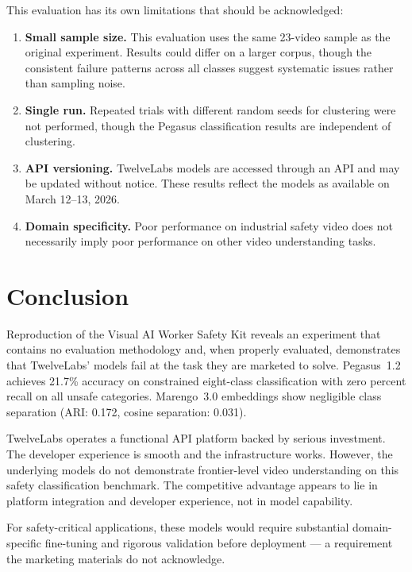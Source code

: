 \documentclass[11pt,a4paper]{article}
\begin{document}
This evaluation has its own limitations that should be acknowledged:

\begin{enumerate}
    \item \textbf{Small sample size.} This evaluation uses the same 23-video sample as the original experiment. Results could differ on a larger corpus, though the consistent failure patterns across all classes suggest systematic issues rather than sampling noise.
    \item \textbf{Single run.} Repeated trials with different random seeds for clustering were not performed, though the Pegasus classification results are independent of clustering.
    \item \textbf{API versioning.} TwelveLabs models are accessed through an API and may be updated without notice. These results reflect the models as available on March 12--13, 2026.
    \item \textbf{Domain specificity.} Poor performance on industrial safety video does not necessarily imply poor performance on other video understanding tasks.
\end{enumerate}

\section{Conclusion}

Reproduction of the Visual AI Worker Safety Kit reveals an experiment that contains no evaluation methodology and, when properly evaluated, demonstrates that TwelveLabs' models fail at the task they are marketed to solve. Pegasus~1.2 achieves 21.7\% accuracy on constrained eight-class classification with zero percent recall on all unsafe categories. Marengo~3.0 embeddings show negligible class separation (ARI: 0.172, cosine separation: 0.031).

TwelveLabs operates a functional API platform backed by serious investment. The developer experience is smooth and the infrastructure works. However, the underlying models do not demonstrate frontier-level video understanding on this safety classification benchmark. The competitive advantage appears to lie in platform integration and developer experience, not in model capability.

For safety-critical applications, these models would require substantial domain-specific fine-tuning and rigorous validation before deployment --- a requirement the marketing materials do not acknowledge.

\printbibliography
\end{document}
